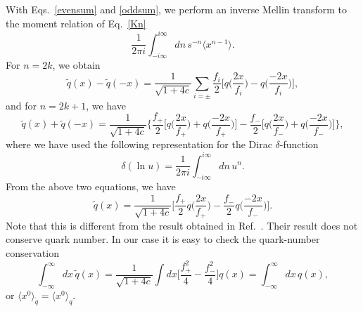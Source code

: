 With Eqs.~\ref{evensum} and \ref{oddsum}, we perform an inverse Mellin transform to the moment relation of Eq.~\ref{Kn}
%
\begin{equation}
\frac{1}{2\pi i}\int_{-i\infty}^{i\infty} dn \, s^{-n} \langle x^{n-1} \rangle .
\end{equation}
%
For $n=2k$, we obtain
%
\begin{equation}\label{pdfrel}
\tilde q(x)-\tilde q(-x)=\frac{1}{\sqrt{1+4c}}\sum_{i=\pm}\frac{f_i}{2}\Big[q\Big(\frac{2x}{f_i}\Big)-q\Big(\frac{-2x}{f_i}\Big)\Big],
\end{equation}
%
and for $n=2k+1$, we have
%
\begin{equation}\label{oddpdfrel}
\tilde q(x)+\tilde q(-x)=\frac{1}{\sqrt{1+4c}}\Big\{\frac{f_+}{2}\Big[q\Big(\frac{2x}{f_+}\Big)+q\Big(\frac{-2x}{f_+}\Big)\Big]-\frac{f_-}{2}\Big[q\Big(\frac{2x}{f_-}\Big)+q\Big(\frac{-2x}{f_-}\Big)\Big]\Big\},
\end{equation}
%
where we have used the following representation for the Dirac $\delta$-function~\cite{Steffens:2012jx}
%
\begin{equation}
\delta(\ln u)=\frac{1}{2\pi i}\int_{-i\infty}^{i\infty}dn\, u^n.
\end{equation}
%
From the above two equations, we have
%
\begin{equation}\label{qinq0}
\tilde q(x)=\frac{1}{\sqrt{1+4c}}\Big[\frac{f_+}{2}q\Big(\frac{2x}{f_+}\Big)-\frac{f_-}{2}q\Big(\frac{-2x}{f_-}\Big)\Big].
\end{equation}
%
Note that this is different from the result obtained in Ref.~\cite{Alexandrou:2015rja}. Their result does not conserve quark number. In our case it is easy to check the quark-number conservation
%
\begin{equation}
\int_{-\infty}^{\infty} dx\, \tilde q(x)=\frac{1}{\sqrt{1+4c}}\int dx \big[\frac{f_+^2}{4}-\frac{f_-^2}{4}\big]q(x)=\int_{-\infty}^{\infty} dx\, q(x),
\end{equation}
%
or $\langle x^0\rangle_{\tilde q}=\langle x^0\rangle_q$.

